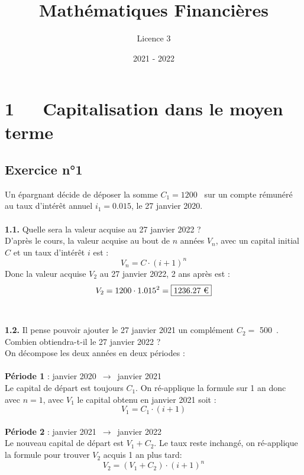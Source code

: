 \documentclass{article}
\title{Mathématiques Financières}
\author{Licence 3}
\date{2021 - 2022}
\begin{document}
\normalsize
\maketitle

\renewcommand*\contentsname{Table des matières}
\newpage

\section{1   Capitalisation dans le moyen terme}
\subsection{Exercice n°1}
\textcolor{exogris}{
Un épargnant décide de déposer la somme $C_1 = 1200$ \texteuro sur un compte rémunéré au taux d’intérêt annuel $i_1 = 0.015$, le 27 janvier 2020.
}
\\\\ \textcolor{exogris}{\textbf{1.1.}
Quelle sera la valeur acquise au 27 janvier 2022 ?
}
\\%
D'après le cours, la valeur acquise au bout de $n$ années $V_n$, avec un capital initial $C$ et un taux d'intérêt $i$ est :
$$V_n = C\cdot(i+1)^n$$
Donc la valeur acquise $V_2$ au 27 janvier 2022, 2 ans après est :
$$V_2 = 1200 \cdot 1.015^2 = \boxed{1236.27 \text{ \texteuro}}$$
\\%
\\%
\textcolor{exogris}{\textbf{1.2.}
Il pense pouvoir ajouter le 27 janvier 2021 un complément $C_2 =$ 500 \texteuro. Combien obtiendra-t-il le 27 janvier 2022 ?
}
\\%
On décompose les deux années en deux périodes :
\\\\\textbf{Période 1} : janvier 2020 $\rightarrow$ janvier 2021
\\Le capital de départ est toujours $C_1$. On ré-applique la formule sur 1 an donc avec $n=1$, avec $V_1$ le capital obtenu en janvier 2021 soit :
$$V_1 = C_1 \cdot (i+1)$$
\\\textbf{Période 2} : janvier 2021 $\rightarrow$ janvier 2022
\\Le nouveau capital de départ est $V_1 + C_2$.
Le taux reste inchangé, on ré-applique la formule pour trouver $V_2$ acquis 1 an plus tard:
$$V_2 = (V_1 + C_2) \cdot (i+1)^n $$
\end{document}
